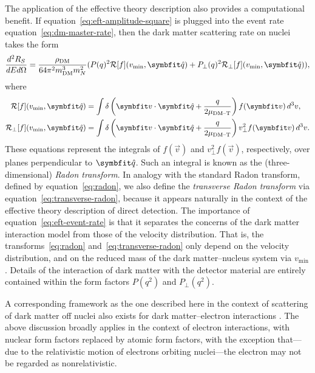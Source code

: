 The application of the effective theory description also provides a computational benefit. If equation~\eqref{eq:eft-amplitude-square} is plugged into the event rate equation~\eqref{eq:dm-master-rate}, then the dark matter scattering rate on nuclei takes the form
\begin{equation}
    \ddder{R_S}{E}{\Omega}=\frac{\rho_\text{DM}}{64\pi^2m_\text{DM}^3m_N^2}(P(q)^2\mathcal{R}[f](v_\text{min},\unitv{q})+P_\perp(q)^2\mathcal{R}_\perp[f](v_\text{min},\unitv{q})),
    \label{eq:eft-event-rate}
\end{equation}
where
\begin{align}
    \label{eq:radon}
    \mathcal{R}[f](v_\text{min},\unitv{q})&=\int\delta\left(\vec{v}\cdot\unitv{q}+\frac{q}{2\mu_\text{DM--T}}\right)f(\vec{v})\difd^3v,\\
    \label{eq:transverse-radon}
    \mathcal{R}_\perp[f](v_\text{min},\unitv{q})&=\int\delta\left(\vec{v}\cdot\unitv{q}+\frac{q}{2\mu_\text{DM--T}}\right)v_\perp^2f(\vec{v})\difd^3v.
\end{align}
These equations represent the integrals of $f(\vec{v})$ and $v_\perp^2f(\vec{v})$, respectively, over planes perpendicular to $\unitv{q}$. Such an integral is known as the (three-dimensional) \emph{Radon transform}. In analogy with the standard Radon transform, defined by equation~\eqref{eq:radon}, we also define the \emph{transverse Radon transform} via equation~\eqref{eq:transverse-radon}, because it appears naturally in the context of the effective theory description of direct detection. The importance of equation~\eqref{eq:eft-event-rate} is that it separates the concerns of the dark matter interaction model from those of the velocity distribution. That is, the transforms~\eqref{eq:radon} and~\eqref{eq:transverse-radon} only depend on the velocity distribution, and on the reduced mass of the dark matter--nucleus system via $v_\text{min}$. Details of the interaction of dark matter with the detector material are entirely contained within the form factors $P(q^2)$ and $P_\perp(q^2)$.

A corresponding framework as the one described here in the context of scattering of dark matter off nuclei also exists for dark matter--electron interactions \parencites{CatenaEtAl2020, CatenaEtAl2021}. The above discussion broadly applies in the context of electron interactions, with nuclear form factors replaced by atomic form factors, with the exception that---due to the relativistic motion of electrons orbiting nuclei---the electron may not be regarded as nonrelativistic.

